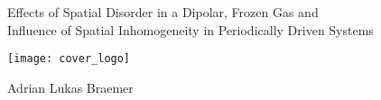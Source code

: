 \documentclass[ oneside,openright,titlepage,BCOR=5mm,
				numbers=noenddot,%
                headinclude,footinclude,cleardoublepage=empty,abstract=on,
                paper=a4,fontsize=11pt]{scrreprt}
\begin{document}
\frenchspacing
\raggedbottom
{} %
\pagestyle{plain}


\begin{titlepage}
	\hfill
	\vspace{2.5cm}
	
	\begin{center}
		\large
		
		\begingroup
		\color{CTtitle}
	
		\vspace{2cm}
		Effects of Spatial Disorder in a Dipolar, Frozen Gas and\\
		Influence of Spatial Inhomogeneity in Periodically Driven Systems
		\endgroup
		
	\end{center}

	\vspace{3cm}
	
	\begin{center}
		\texttt{[image: cover\_logo]}
	\end{center}
	
	\vfill
	
	\begin{center}
		Adrian Lukas Braemer
	\end{center}

	\vspace{1cm}
	

\end{titlepage}
\end{document}
